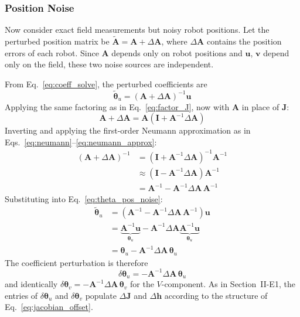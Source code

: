 \documentclass[lettersize,journal]{IEEEtran}
\begin{document}
\subsubsection{Position Noise}

Now consider exact field measurements but noisy robot positions. Let the perturbed position matrix be $\tilde{\mathbf{A}} = \mathbf{A} + \Delta\mathbf{A}$, where $\Delta\mathbf{A}$ contains the position errors of each robot. Since $\mathbf{A}$ depends only on robot positions and $\mathbf{u}$, $\mathbf{v}$ depend only on the field, these two noise sources are independent.

From Eq.~\eqref{eq:coeff_solve}, the perturbed coefficients are
\begin{equation}
    \tilde{\boldsymbol{\theta}}_u = (\mathbf{A} + \Delta\mathbf{A})^{-1}\mathbf{u}
    \label{eq:theta_pos_noise}
\end{equation}
Applying the same factoring as in Eq.~\eqref{eq:factor_J}, now with $\mathbf{A}$ in place of $\mathbf{J}$:
\begin{equation}
    \mathbf{A} + \Delta\mathbf{A} = \mathbf{A}(\mathbf{I} + \mathbf{A}^{-1}\Delta\mathbf{A})
    \label{eq:factor_A}
\end{equation}
Inverting and applying the first-order Neumann approximation as in Eqs.~\eqref{eq:neumann}--\eqref{eq:neumann_approx}:
\begin{align}
    (\mathbf{A} + \Delta\mathbf{A})^{-1} &= (\mathbf{I} + \mathbf{A}^{-1}\Delta\mathbf{A})^{-1}\mathbf{A}^{-1} \nonumber \\
    &\approx (\mathbf{I} - \mathbf{A}^{-1}\Delta\mathbf{A})\mathbf{A}^{-1} \nonumber \\
    &= \mathbf{A}^{-1} - \mathbf{A}^{-1}\Delta\mathbf{A}\,\mathbf{A}^{-1}
    \label{eq:A_first_order_inv}
\end{align}
Substituting into Eq.~\eqref{eq:theta_pos_noise}:
\begin{align}
    \tilde{\boldsymbol{\theta}}_u &= (\mathbf{A}^{-1} - \mathbf{A}^{-1}\Delta\mathbf{A}\,\mathbf{A}^{-1})\mathbf{u} \nonumber \\
    &= \underbrace{\mathbf{A}^{-1}\mathbf{u}}_{\boldsymbol{\theta}_u} - \mathbf{A}^{-1}\Delta\mathbf{A}\underbrace{\mathbf{A}^{-1}\mathbf{u}}_{\boldsymbol{\theta}_u} \nonumber \\
    &= \boldsymbol{\theta}_u - \mathbf{A}^{-1}\Delta\mathbf{A}\,\boldsymbol{\theta}_u
    \label{eq:theta_u_pos_perturbed}
\end{align}
The coefficient perturbation is therefore
\begin{equation}
    \delta\boldsymbol{\theta}_u = -\mathbf{A}^{-1}\Delta\mathbf{A}\,\boldsymbol{\theta}_u
    \label{eq:delta_theta_u_pos}
\end{equation}
and identically $\delta\boldsymbol{\theta}_v = -\mathbf{A}^{-1}\Delta\mathbf{A}\,\boldsymbol{\theta}_v$ for the $V$-component. As in Section~II-E1, the entries of $\delta\boldsymbol{\theta}_u$ and $\delta\boldsymbol{\theta}_v$ populate $\Delta\mathbf{J}$ and $\Delta\mathbf{h}$ according to the structure of Eq.~\eqref{eq:jacobian_offset}.
\end{document}
